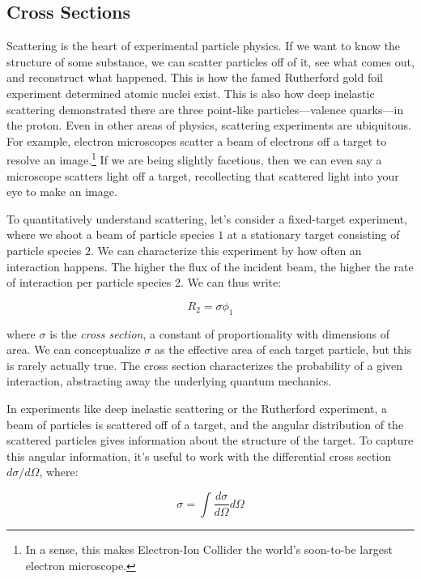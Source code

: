 \documentclass[../main.tex]{subfiles}
\begin{document}
\subsection{Cross Sections}
Scattering is the heart of experimental particle physics. If we want to know the structure of some substance, we can scatter particles off of it, see what comes out, and reconstruct what happened. This is how the famed Rutherford gold foil experiment determined atomic nuclei exist. This is also how deep inelastic scattering demonstrated there are three point-like particles---valence quarks---in the proton. 
Even in other areas of physics, scattering experiments are ubiquitous. For example, electron microscopes scatter a beam of electrons off a target to resolve an image.\footnote{In a sense, this makes Electron-Ion Collider the world's soon-to-be largest electron microscope.} If we are being slightly facetious, then we can even say a microscope scatters light off a target, recollecting that scattered light into your eye to make an image. 

To quantitatively understand scattering, let's consider a fixed-target experiment, where we shoot a beam of particle species $1$ at a stationary target consisting of particle species $2$. We can characterize this experiment by how often an interaction happens. The higher the flux of the incident beam, the higher the rate of interaction per particle species $2$. We can thus write:

\begin{equation}
    R_2 = \sigma \phi_1
\end{equation}

where $\sigma$ is the \textit{cross section}, a constant of proportionality with dimensions of area. We can conceptualize $\sigma$ as the effective area of each target particle, but this is rarely actually true. The cross section characterizes the probability of a given interaction, abstracting away the underlying quantum mechanics. 

In experiments like deep inelastic scattering or the Rutherford experiment, a beam of particles is scattered off of a target, and the angular distribution of the scattered particles gives information about the structure of the target. To capture this angular information, it's useful to work with the differential cross section $d\sigma/d\Omega$, where:

\begin{equation}
    \sigma = \int \frac{d\sigma}{d\Omega} d\Omega
\end{equation}
\end{document}
